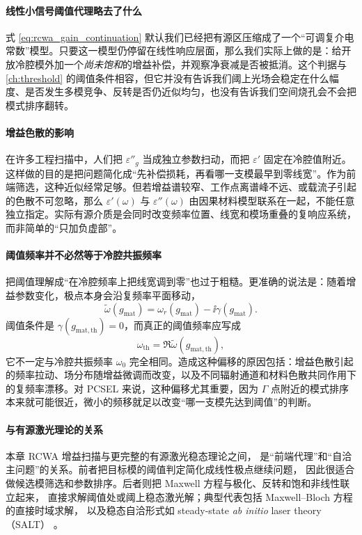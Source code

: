 \paragraph{线性小信号阈值代理略去了什么}
式 \eqref{eq:rcwa_gain_continuation} 默认我们已经把有源区压缩成了一个“可调复介电常数”模型。只要这一模型仍停留在线性响应层面，那么我们实际上做的是：给开放冷腔模外加一个\emph{尚未饱和}的增益补偿，并观察净衰减是否被抵消。这个判据与 \cref{ch:threshold} 的阈值条件相容，但它并没有告诉我们阈上光场会稳定在什么幅度、是否发生多模竞争、反转是否仍近似均匀，也没有告诉我们空间烧孔会不会把模式排序翻转。

\paragraph{增益色散的影响}
在许多工程扫描中，人们把 $\varepsilon''_g$ 当成独立参数扫动，而把 $\varepsilon'$ 固定在冷腔值附近。这样做的目的是把问题简化成“先补偿损耗，再看哪一支模最早到零线宽”。作为前端筛选，这种近似经常足够。但若增益谱较窄、工作点离谱峰不远、或载流子引起的色散不可忽略，那么 $\varepsilon'(\omega)$ 与 $\varepsilon''(\omega)$ 由因果材料模型联系在一起，不能任意独立指定。实际有源介质是会同时改变频率位置、线宽和模场重叠的复响应系统，而非简单的“只加负虚部”。

\paragraph{阈值频率并不必然等于冷腔共振频率}
把阈值理解成“在冷腔频率上把线宽调到零”也过于粗糙。更准确的说法是：随着增益参数变化，极点本身会沿复频率平面移动，
\begin{equation}
\tilde{\omega}(g_{\mathrm{mat}})=\omega_r(g_{\mathrm{mat}})-\ii\gamma(g_{\mathrm{mat}}).
\end{equation}
阈值条件是 $\gamma(g_{\mathrm{mat,th}})=0$，而真正的阈值频率应写成
\begin{equation}
\omega_{\mathrm{th}}=\Re \tilde{\omega}(g_{\mathrm{mat,th}}),
\end{equation}
它不一定与冷腔共振频率 $\omega_0$ 完全相同。造成这种偏移的原因包括：增益色散引起的频率拉动、场分布随增益微调而改变，以及不同辐射通道和材料色散共同作用下的复频率漂移。对 PCSEL 来说，这种偏移尤其重要，因为 $\Gamma$ 点附近的模式排序本来就可能很近，微小的频移就足以改变“哪一支模先达到阈值”的判断。

\paragraph{与有源激光理论的关系}
本章 RCWA 增益扫描与更完整的有源激光稳态理论之间，
是“前端代理”和“自洽主问题”的关系。前者把目标模的阈值判定简化成线性极点继续问题，
因此很适合做候选模筛选和参数排序。后者则把 Maxwell 方程与极化、反转和饱和非线性联立起来，
直接求解阈值处或阈上稳态激光解；典型代表包括 Maxwell--Bloch 方程的直接时域求解，
以及稳态自洽形式如 steady-state \emph{ab initio} laser theory（SALT）
\cite{tureci2007salt,tureci2009salt}。

